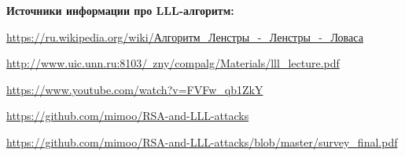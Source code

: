 \documentclass[12pt,a4paper]{scrartcl}
\begin{document}
\textbf{Источники информации про LLL-алгоритм:}

\href{https://ru.wikipedia.org/wiki/%D0%90%D0%BB%D0%B3%D0%BE%D1%80%D0%B8%D1%82%D0%BC_%D0%9B%D0%B5%D0%BD%D1%81%D1%82%D1%80%D1%8B_%E2%80%94_%D0%9B%D0%B5%D0%BD%D1%81%D1%82%D1%80%D1%8B_%E2%80%94_%D0%9B%D0%BE%D0%B2%D0%B0%D1%81%D0%B0}{https://ru.wikipedia.org/wiki/Алгоритм\_Ленстры\_-\_Ленстры\_-\_Ловаса}
	
\href{http://www.uic.unn.ru:8103/~zny/compalg/Materials/lll_lecture.pdf}{http://www.uic.unn.ru:8103/~zny/compalg/Materials/lll\_lecture.pdf}
	
\href{https://www.youtube.com/watch?v=FVFw_qb1ZkY}{https://www.youtube.com/watch?v=FVFw\_qb1ZkY}
	
\href{https://github.com/mimoo/RSA-and-LLL-attacks}{https://github.com/mimoo/RSA-and-LLL-attacks}
	
\href{https://github.com/mimoo/RSA-and-LLL-attacks/blob/master/survey_final.pdf}{https://github.com/mimoo/RSA-and-LLL-attacks/blob/master/survey\_final.pdf}\\
	
\end{document}
